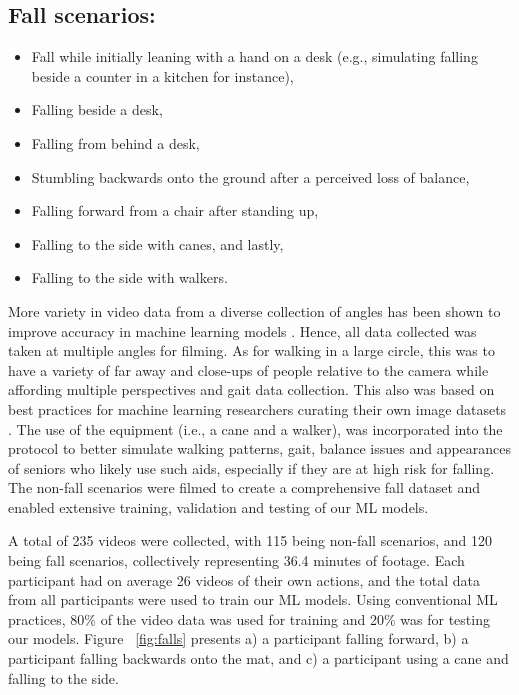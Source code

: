 \subsection{Fall scenarios:}
 \begin{itemize}
      \item Fall while initially leaning with a hand on a desk (e.g., simulating falling beside a counter in a kitchen for instance),
      \item Falling beside a desk,
      \item Falling from behind a desk,
      \item Stumbling backwards onto the ground after a perceived loss of balance,
      \item Falling forward from a chair after standing up,
      \item Falling to the side with canes, and lastly,
      \item Falling to the side with walkers.
\end{itemize}


More variety in video data from a diverse collection of angles has been shown to improve accuracy in machine learning models \cite{Auvinet2011, Kwolek2014, Antoine2013}.  Hence, all data collected was taken at multiple angles for filming. As for walking in a large circle, this was to have a variety of far away and close-ups of people relative to the camera while affording multiple perspectives and gait data collection.  This also was based on best practices for machine learning researchers curating their own image datasets \cite{Auvinet2011, Kwolek2014, Antoine2013}.  The use of the equipment (i.e., a cane and a walker), was incorporated into the protocol to better simulate walking patterns, gait, balance issues and appearances of seniors who likely use such aids, especially if they are at high risk for falling.  The non-fall scenarios were filmed to create a comprehensive fall dataset and enabled extensive training, validation and testing of our ML models.

A total of 235 videos were collected, with 115 being non-fall scenarios, and 120 being fall scenarios, collectively representing 36.4 minutes of footage. Each participant had on average 26 videos of their own actions, and the total data from all participants were used to train our ML models. Using conventional ML practices, 80\% of the video data was used for training and 20\% was for testing our models. Figure ~\ref{fig:falls} presents a) a participant falling forward, b) a participant falling backwards onto the mat, and c) a participant using a cane and falling to the side.

